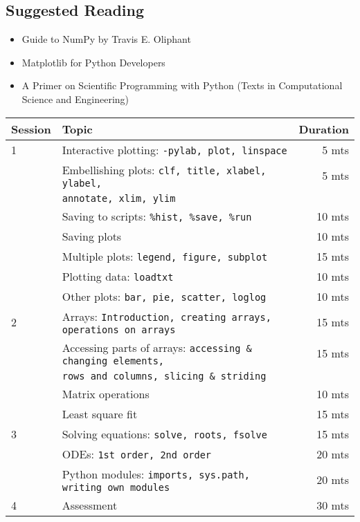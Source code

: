 \documentclass{article}
\begin{document}
\subsection{Suggested Reading}
\begin{itemize}
    \item Guide to NumPy by Travis E. Oliphant
    \item Matplotlib for Python Developers
    \item A Primer on Scientific Programming with Python (Texts in Computational Science and Engineering)
\end{itemize}

\begin{tabular}{llr}
\hline
Session & Topic & Duration\\\hline
1 & Interactive plotting: \tt{-pylab, plot, linspace}                     & ~5 mts\\
  & Embellishing plots: \tt{clf, title, xlabel, ylabel,}                  & ~5 mts\\
  & \tt{annotate, xlim, ylim}                                             &\\
  & Saving to scripts: \tt{\%hist, \%save, \%run}                         & 10 mts\\
  & Saving plots                                                          & 10 mts\\
  & Multiple plots: \tt{legend, figure, subplot}                          & 15 mts\\
  & Plotting data: \tt{loadtxt}                                           & 10 mts\\
  & Other plots: \tt{bar, pie, scatter, loglog}                           & 10 mts\\\hline

2 & Arrays: \tt{Introduction, creating arrays, operations on arrays}      & 15 mts\\
  & Accessing parts of arrays: \tt{accessing \& changing elements,}       & 15 mts\\
  & \tt{rows and columns, slicing \& striding}                            &\\
  & Matrix operations                                                     & 10 mts\\
  & Least square fit                                                      & 15 mts\\\hline

3 & Solving equations: \tt{solve, roots, fsolve}                          & 15 mts\\
  & ODEs: \tt{1st order, 2nd order}                                       & 20 mts\\
  & Python modules: \tt{imports, sys.path, writing own modules}           & 20 mts\\\hline

4 & Assessment                                                            & 30 mts\\\hline\hline
\end{tabular}  
\end{document}
